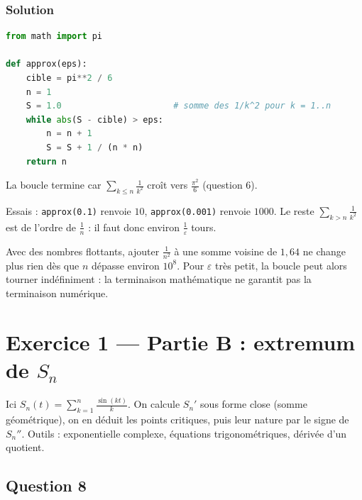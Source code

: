 \documentclass[11pt,a4paper]{article}
\begin{document}
\hypertarget{solution-9}{%
\subsubsection{Solution}\label{solution-9}}

\begin{lstlisting}[language=Python]
from math import pi

def approx(eps):
    cible = pi**2 / 6
    n = 1
    S = 1.0                      # somme des 1/k^2 pour k = 1..n
    while abs(S - cible) > eps:
        n = n + 1
        S = S + 1 / (n * n)
    return n
\end{lstlisting}

La boucle termine car \(\sum_{k\le n}\frac1{k^2}\) croît vers \(\frac{\pi^2}6\) (question 6).

Essais : \texttt{approx(0.1)} renvoie \(10\), \texttt{approx(0.001)} renvoie \(1000\). Le reste \(\sum_{k>n}\frac1{k^2}\) est de l'ordre de \(\frac1n\) : il faut donc environ \(\frac1\varepsilon\) tours.

\begin{piege}

Avec des nombres flottants, ajouter \(\frac1{n^2}\) à une somme voisine de \(1{,}64\) ne change plus rien dès que \(n\) dépasse environ \(10^8\). Pour \(\varepsilon\) très petit, la boucle peut alors tourner indéfiniment : la terminaison mathématique ne garantit pas la terminaison numérique.

\end{piege}

\hypertarget{exercice-1-partie-b-extremum-de-s_n}{%
\section{\texorpdfstring{Exercice 1 --- Partie B : extremum de \(S_n\)}{Exercice 1 --- Partie B : extremum de S\_n}}\label{exercice-1-partie-b-extremum-de-s_n}}

Ici \(S_n(t)=\sum_{k=1}^n\frac{\sin(kt)}k\). On calcule \(S_n'\) sous forme close (somme géométrique), on en déduit les points critiques, puis leur nature par le signe de \(S_n''\). Outils : exponentielle complexe, équations trigonométriques, dérivée d'un quotient.

\hypertarget{question-8}{%
\subsection{Question 8}\label{question-8}}
\end{document}
